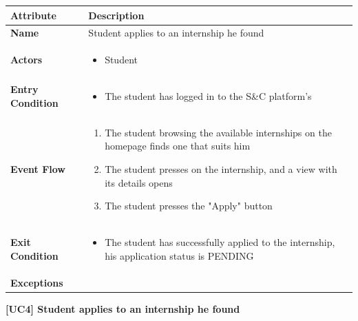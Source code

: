 \begin{center}
    
    \begin{tabular}{|p{3cm}|p{9cm}|}
    \hline
    \textbf{Attribute} & \textbf{Description} \\ \hline
    \textbf{Name} & Student applies to an internship he found \\ \hline
    \textbf{Actors} & 
    \begin{itemize}
        \item Student
    \end{itemize} \\ \hline
    \textbf{Entry Condition} & 
    \begin{itemize}
        \item The student has logged in to the S\&C platform's
    \end{itemize}\\ \hline
    \textbf{Event Flow} & 
    \begin{enumerate}
        \item The student browsing the available internships on the homepage finds one that suits him
        \item The student presses on the internship, and a view with its details opens
        \item The student presses the "Apply" button
    \end{enumerate} \\ \hline
    \textbf{Exit Condition} & 
    \begin{itemize}
        \item The student has successfully applied to the internship, his application status is PENDING
    \end{itemize} \\ \hline
    \textbf{Exceptions} & 
     \\ \hline
    \end{tabular}
    \newline
    \newline
    \textbf{[UC4] Student applies to an internship he found}
    \newline
    \newline
    

\end{center}
